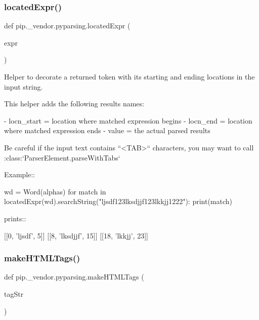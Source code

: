 \subsubsection{\texorpdfstring{located\+Expr()}{locatedExpr()}}
{\footnotesize\ttfamily def pip.\+\_\+vendor.\+pyparsing.\+located\+Expr (\begin{DoxyParamCaption}\item[{}]{expr }\end{DoxyParamCaption})}

\begin{DoxyVerb}Helper to decorate a returned token with its starting and ending
locations in the input string.

This helper adds the following results names:

 - locn_start = location where matched expression begins
 - locn_end = location where matched expression ends
 - value = the actual parsed results

Be careful if the input text contains ``<TAB>`` characters, you
may want to call :class:`ParserElement.parseWithTabs`

Example::

    wd = Word(alphas)
    for match in locatedExpr(wd).searchString("ljsdf123lksdjjf123lkkjj1222"):
        print(match)

prints::

    [[0, 'ljsdf', 5]]
    [[8, 'lksdjjf', 15]]
    [[18, 'lkkjj', 23]]
\end{DoxyVerb}
 \mbox{\label{namespacepip_1_1__vendor_1_1pyparsing_a892b27b01a0dd1be92cd6e5bc98a5791}} 
\subsubsection{\texorpdfstring{make\+H\+T\+M\+L\+Tags()}{makeHTMLTags()}}
{\footnotesize\ttfamily def pip.\+\_\+vendor.\+pyparsing.\+make\+H\+T\+M\+L\+Tags (\begin{DoxyParamCaption}\item[{}]{tag\+Str }\end{DoxyParamCaption})}

